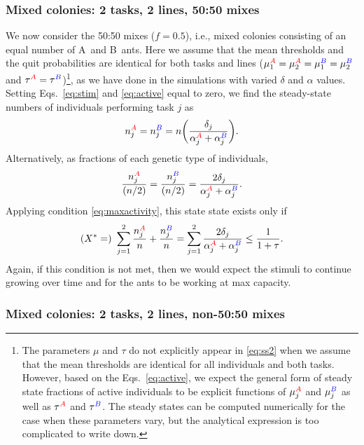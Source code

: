 \documentclass[11pt]{article}
\newcommand{\A}{{\color{red}A}}
\newcommand{\B}{{\color{blue}B}}
\begin{document}
\begin{appendices}
\newpage
\subsubsection{Mixed colonies: 2 tasks, 2 lines, 50:50 mixes} \label{sec:5050}

We now consider the 50:50 mixes ($f=0.5$), i.e., mixed colonies consisting of an equal number of \A\ and \B\ ants.
Here we assume that the mean thresholds and the quit probabilities are identical for both tasks and lines ($\mu_1^{\A} = \mu_2^{\A} = \mu_1^{\B} = \mu_2^{\B}$ and $\tau^{\A} = \tau^{\B}$)\footnote{The parameters $\mu$ and $\tau$ do not explicitly appear in \eqref{eq:ss2} when we assume that the mean thresholds are identical for all individuals and both tasks. However, based on the Eqs.~\eqref{eq:active}, we expect the general form of steady state fractions of active individuals to be explicit functions of $\mu_j^{\A}$ and $\mu_j^{\B}$ as well as $\tau^{\A}$ and $\tau^{\B}$. The steady states can be computed numerically for the case when these parameters vary, but the analytical expression is too complicated to write down.}, as we have done in the simulations with varied $\delta$ and $\alpha$ values. Setting Eqs.~\eqref{eq:stim} and \eqref{eq:active} equal to zero, we find the steady-state numbers of individuals performing task $j$ as
\begin{equation}
     n_j^{\A} =  n_j^{\B} = n\bigg(\frac{\delta_j}{\alpha_j^{\A} + \alpha_j^{\B}}\bigg). \label{eq:ss2a}
\end{equation}
Alternatively, as fractions of each genetic type of individuals,
\begin{equation}
     \frac{n_j^{\A}}{(n/2)} =  \frac{n_j^{\B}}{(n/2)} = \frac{2\delta_j}{\alpha_j^{\A} + \alpha_j^{\B}}. \label{eq:ss2}
\end{equation}
Applying condition \eqref{eq:maxactivity}, this state state exists only if
\begin{equation}
     (X^*=)\ \sum_{j=1}^2 \frac{n_j^{\A}}{n} + \frac{n_j^{\B}}{n} 
     = \sum_{j=1}^2 \frac{2\delta_j}{\alpha_j^{\A} + \alpha_j^{\B}}
     \leq \frac{1}{1+\tau}.
     \label{eq:cond2}
\end{equation}
Again, if this condition is not met, then we would expect the stimuli to continue growing over time and for the ants to be working at max capacity.

\subsubsection{Mixed colonies: 2 tasks, 2 lines, non-50:50 mixes}


\end{appendices}
\end{document}
